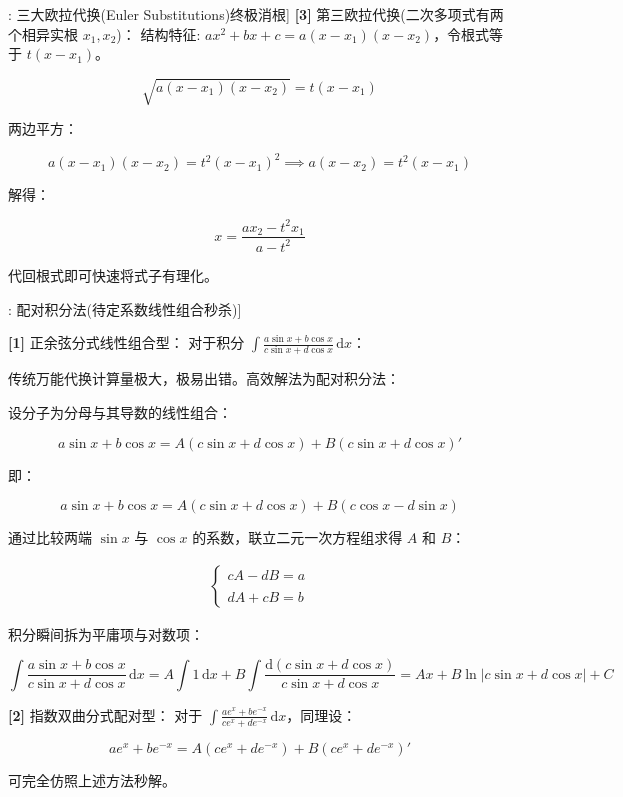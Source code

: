 \documentclass[11pt,a4paper,UTF8]{ctexart}
\begin{document}
\begin{thmbox}[模型[1]: 三大欧拉代换(Euler Substitutions)终极消根]
\textbf{[3]} 第三欧拉代换(二次多项式有两个相异实根 $x_1, x_2$)：
结构特征: $ax^2+bx+c = a(x-x_1)(x-x_2)$，令根式等于 $t(x-x_1)$。


\begin{equation*}
\sqrt{a(x-x_1)(x-x_2)} = t(x-x_1)
\end{equation*}


两边平方：


\begin{equation*}
a(x-x_1)(x-x_2) = t^2(x-x_1)^2 \implies a(x-x_2) = t^2(x-x_1)
\end{equation*}


解得：


\begin{equation*}
x = \frac{ax_2 - t^2 x_1}{a - t^2}
\end{equation*}


代回根式即可快速将式子有理化。

\end{thmbox}
\begin{thmbox}[模型[2]: 配对积分法(待定系数线性组合秒杀)]

\textbf{[1]} 正余弦分式线性组合型：
对于积分 $\int \frac{a\sin x + b\cos x}{c\sin x + d\cos x}\,\mathrm{d}x$：

传统万能代换计算量极大，极易出错。高效解法为配对积分法：

设分子为分母与其导数的线性组合：


\begin{equation*}
a\sin x + b\cos x = A(c\sin x + d\cos x) + B(c\sin x + d\cos x)'
\end{equation*}


即：


\begin{equation*}
a\sin x + b\cos x = A(c\sin x + d\cos x) + B(c\cos x - d\sin x)
\end{equation*}


通过比较两端 $\sin x$ 与 $\cos x$ 的系数，联立二元一次方程组求得 $A$ 和 $B$：


\begin{align*}
\begin{cases} cA - dB = a \\ \\ dA + cB = b \end{cases}
\end{align*}


积分瞬间拆为平庸项与对数项：


\begin{equation*}
\int \frac{a\sin x + b\cos x}{c\sin x + d\cos x}\,\mathrm{d}x = A\int 1\,\mathrm{d}x + B\int \frac{\mathrm{d}(c\sin x + d\cos x)}{c\sin x + d\cos x} = Ax + B\ln|c\sin x + d\cos x| + C
\end{equation*}


\textbf{[2]} 指数双曲分式配对型：
对于 $\int \frac{a e^x + b e^{-x}}{c e^x + d e^{-x}}\,\mathrm{d}x$，同理设：


\begin{equation*}
a e^x + b e^{-x} = A(c e^x + d e^{-x}) + B(c e^x + d e^{-x})'
\end{equation*}


可完全仿照上述方法秒解。

\end{thmbox}
\end{document}
